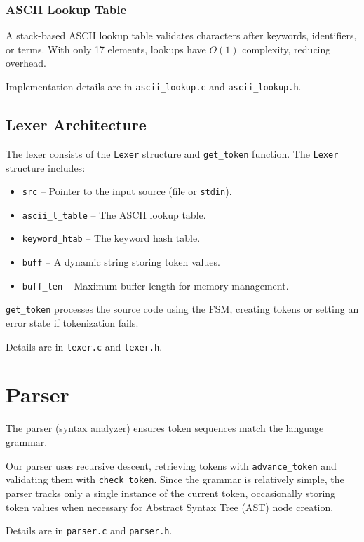 \documentclass[12pt,a4paper]{article}
\begin{document}
\subsubsection{ASCII Lookup Table}
A stack-based ASCII lookup table validates characters after keywords, identifiers, or terms. With only 17 elements, lookups have \( O(1) \) complexity, reducing overhead. 

Implementation details are in \texttt{ascii\_lookup.c} and \texttt{ascii\_lookup.h}.

\newpage

\subsection{Lexer Architecture}
The lexer consists of the \texttt{Lexer} structure and \texttt{get\_token} function. The \texttt{Lexer} structure includes:

\begin{itemize}
    \item \texttt{src} – Pointer to the input source (file or \texttt{stdin}).
    \item \texttt{ascii\_l\_table} – The ASCII lookup table.
    \item \texttt{keyword\_htab} – The keyword hash table.
    \item \texttt{buff} – A dynamic string storing token values.
    \item \texttt{buff\_len} – Maximum buffer length for memory management.
\end{itemize}

\texttt{get\_token} processes the source code using the FSM, creating tokens or setting an error state if tokenization fails.

Details are in \texttt{lexer.c} and \texttt{lexer.h}.

\section{Parser}
The parser (syntax analyzer) ensures token sequences match the language grammar.

Our parser uses recursive descent, retrieving tokens with \texttt{advance\_token} and validating them with \texttt{check\_token}. Since the grammar is relatively simple, the parser tracks only a single instance of the current token, occasionally storing token values when necessary for Abstract Syntax Tree (AST) node creation.

Details are in \texttt{parser.c} and \texttt{parser.h}.
\end{document}
